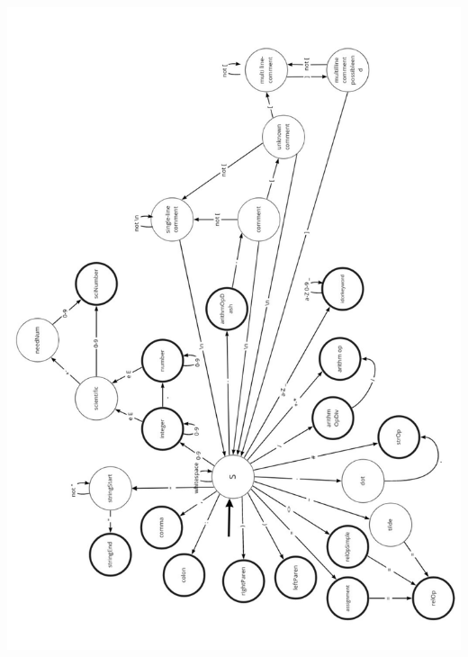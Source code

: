 \documentclass[a4paper, 12pt]{article}
\begin{document}
\includegraphics[scale=0.36]{fsm_rotated.png}
\end{document}
